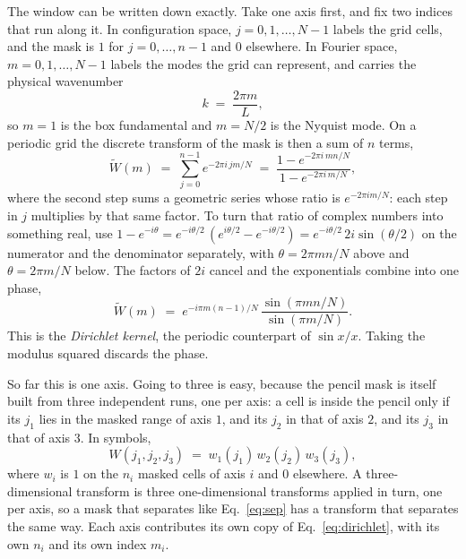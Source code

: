 \documentclass[12pt]{article}
\begin{document}
The window can be written down exactly. Take one axis first, and fix two indices
that run along it. In configuration space, $j = 0, 1, \dots, N-1$ labels the
grid cells, and the mask is $1$ for $j = 0, \dots, n-1$ and $0$ elsewhere. In
Fourier space, $m = 0, 1, \dots, N-1$ labels the modes the grid can represent,
and carries the physical wavenumber
\begin{equation}
  \label{eq:mdef}
  k \;=\; \frac{2\pi m}{L} ,
\end{equation}
so $m = 1$ is the box fundamental and $m = N/2$ is the Nyquist mode. On a
periodic grid the discrete transform of the mask is then a sum of $n$ terms,
\begin{equation}
  \label{eq:geo}
  \widetilde W(m) \;=\; \sum_{j=0}^{n-1} e^{-2\pi i\, jm/N}
  \;=\; \frac{1 - e^{-2\pi i\, mn/N}}{1 - e^{-2\pi i\, m/N}} ,
\end{equation}
where the second step sums a geometric series whose ratio is
$e^{-2\pi i m/N}$: each step in $j$ multiplies by that same factor. To turn that ratio of complex numbers into something real,
use $1 - e^{-i\theta} = e^{-i\theta/2}\,(e^{i\theta/2} - e^{-i\theta/2})
= e^{-i\theta/2}\,2i\sin(\theta/2)$ on the numerator and the denominator
separately, with $\theta = 2\pi mn/N$ above and $\theta = 2\pi m/N$ below. The
factors of $2i$ cancel and the exponentials combine into one phase,
\begin{equation}
  \label{eq:dirichlet}
  \widetilde W(m) \;=\; e^{-i\pi m (n-1)/N}\,
  \frac{\sin(\pi m n/N)}{\sin(\pi m/N)} .
\end{equation}
This is the \emph{Dirichlet kernel}, the periodic counterpart of $\sin x/x$.
Taking the modulus squared discards the phase.

So far this is one axis. Going to three is easy, because the pencil mask is
itself built from three independent runs, one per axis: a cell is inside the
pencil only if its $j_1$ lies in the masked range of axis $1$, and its $j_2$ in
that of axis $2$, and its $j_3$ in that of axis $3$. In symbols,
\begin{equation}
  \label{eq:sep}
  W(j_1, j_2, j_3) \;=\; w_1(j_1)\, w_2(j_2)\, w_3(j_3) ,
\end{equation}
where $w_i$ is $1$ on the $n_i$ masked cells of axis $i$ and $0$ elsewhere. A
three-dimensional transform is three one-dimensional transforms applied in turn,
one per axis, so a mask that separates like Eq.~\eqref{eq:sep} has a transform
that separates the same way. Each axis contributes its own copy of
Eq.~\eqref{eq:dirichlet}, with its own $n_i$ and its own index $m_i$.
\end{document}

